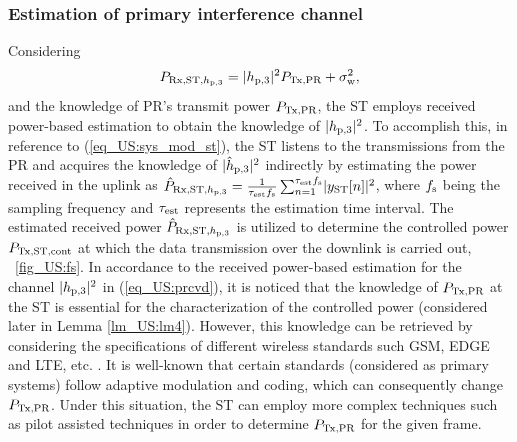 \subsubsection{Estimation of primary interference channel}
Considering
\begin{equation}
P_{\text{Rx,ST,$h_{\text{p,3}}$}} = |h_{\text{p,3}}|^2 P_{\text{Tx,PR}} + \sigma^2_{\text{w}} \label{eq_US:prcvd}, 
\end{equation}
and the knowledge of PR's transmit power $P_{\text{Tx,PR}}$, the ST employs received power-based estimation to obtain the knowledge of $|h_{\text{p,3}}|^2$. To accomplish this, in reference to (\ref{eq_US:sys_mod_st}), the ST listens to the transmissions from the PR and acquires the knowledge of $|\hat{h}_{\text{p,3}}|^2$ indirectly by estimating the power received in the uplink as $\hat{P}_{\text{Rx,ST,$h_{\text{p,3}}$}} = {\frac{1}{{\tau_{\text{est}} f_{\text{s}}}}\sum_{n=1}^{\tau_{\text{est}} f_{\text{s}}}} {|y_{\text{ST}}[n]|^2}$, where $f_{\text{s}}$ being the sampling frequency and $\tau_{\text{est}}$ represents the estimation time interval. 
The estimated received power $\hat{P}_{\text{Rx,ST,$h_{\text{p,3}}$}}$ is utilized to determine the controlled power $P_{\text{Tx,ST,cont}}$ at which the data transmission over the downlink is carried out, \figurename~\ref{fig_US:fs}. In accordance to the received power-based estimation for the channel $|h_{\text{p,3}}|^2$ in (\ref{eq_US:prcvd}), it is noticed that the knowledge of $P_{\text{Tx,PR}}$ at the ST is essential for the characterization of the controlled power (considered later in Lemma \ref{lm_US:lm4}). However, this knowledge can be retrieved by considering the specifications of different wireless standards such GSM, EDGE and LTE, etc. \cite{Sharma14}. It is well-known that certain standards (considered as primary systems) follow adaptive modulation and coding, which can consequently change $P_{\text{Tx,PR}}$. Under this situation, the ST can employ more complex techniques such as pilot assisted techniques in order to determine $P_{\text{Tx,PR}}$ for the given frame.

